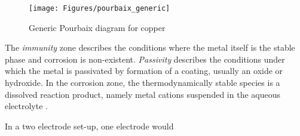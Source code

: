 {%
	\begin{wrapfigure}{l}{0.5\textwidth}
		\centering
		\texttt{[image: Figures/pourbaix\_generic]}
		\caption{Generic Pourbaix diagram for copper}
		\label{fig:pourbaix_generic}
	\end{wrapfigure}

The \textit{immunity} zone describes the conditions where the metal itself is the stable phase and corrosion is non-existent. \textit{Passivity} describes the conditions under which the metal is passivated by formation of a coating, usually an oxide or hydroxide. In the corrosion zone, the thermodynamically stable species is a dissolved reaction product, namely metal cations suspended in the aqueous electrolyte \citep{Beverskog1995}.

In a two electrode set-up, one electrode would 

}